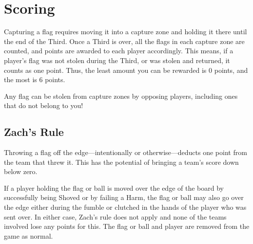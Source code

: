 \section{Scoring} \label{scoring}
Capturing a flag requires moving it into a capture zone and holding it there until the end of the Third.
Once a Third is over, all the flags in each capture zone are counted, and points are awarded to each player accordingly.
This means, if a player's flag was not stolen during the Third, or was stolen and returned, it counts as one point.
Thus, the least amount you can be rewarded is 0 points, and the most is 6 points.

\begin{note}
    Any flag can be stolen from capture zones by opposing players, including ones that do not belong to you!
\end{note}

\subsection{Zach's Rule}
Throwing a flag off the edge---intentionally or otherwise---deducts one point from the team that threw it.
This has the potential of bringing a team's score down below zero.

\begin{note}
    If a player holding the flag or ball is moved over the edge of the board by successfully being Shoved or by failing a Harm, the flag or ball may also go over the edge either during the fumble or clutched in the hands of the player who was sent over.
    In either case, Zach's rule does not apply and none of the teams involved lose any points for this.
    The flag or ball and player are removed from the game as normal.
\end{note}